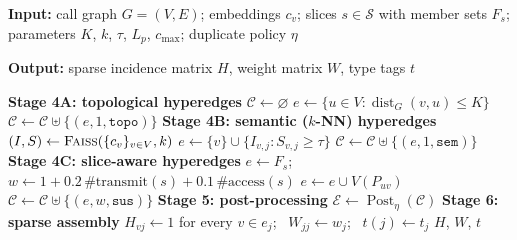 \begin{algorithm}[tbp]
  \caption[Construction and assembly of the \hgann{} hypergraph]{Construction and assembly of the
  \hgann{} hypergraph. Stages 4A to 4C restore the algorithm of the source publication
  \cite{norouzian2025hgannmal} with the conventions of Equations~\ref{eq:hgann:topo}
  to~\ref{eq:hgann:sus} written in; stages 5 and 6 add the post-processing and assembly that its
  prose describes.}
  \label{alg:hgann:construction}
  \small
  \textbf{Input:} call graph $G = (V, E)$; embeddings $c_v$; slices $s \in \mathcal{S}$ with
  member sets $F_s$; parameters $K$, $k$, $\tau$, $L_p$, $c_{\max}$; duplicate policy $\eta$\par
  \textbf{Output:} sparse incidence matrix $H$, weight matrix $W$, type tags $t$
  \begin{algorithmic}[1]
    \Statex \textbf{Stage 4A: topological hyperedges}
    \State $\mathcal{C} \gets \varnothing$ 
      \State $e \gets \{u \in V : \operatorname{dist}_G(v,u) \le K\}$
        \State $\mathcal{C} \gets \mathcal{C} \uplus \{(e, 1, \texttt{topo})\}$
      \EndIf
    \EndFor
    \Statex \textbf{Stage 4B: semantic ($k$-NN) hyperedges}
    \State $(I, S) \gets \textsc{Faiss}(\{c_v\}_{v \in V}, k)$
      \State $e \gets \{v\} \cup \{I_{v,j} : S_{v,j} \ge \tau\}$
        \State $\mathcal{C} \gets \mathcal{C} \uplus \{(e, 1, \texttt{sem})\}$
      \EndIf
    \EndFor
    \Statex \textbf{Stage 4C: slice-aware hyperedges}
      \State $e \gets F_s$; \ $w \gets 1 + 0.2\,\#\text{transmit}(s) + 0.1\,\#\text{access}(s)$
       
          \State $e \gets e \cup V(P_{uv})$
        \EndIf
      \EndFor
        \State $\mathcal{C} \gets \mathcal{C} \uplus \{(e, w, \texttt{sus})\}$
      \EndIf
    \EndFor
    \Statex \textbf{Stage 5: post-processing}
    \State $\mathcal{E} \gets \operatorname{Post}_{\eta}(\mathcal{C})$
    \Statex \textbf{Stage 6: sparse assembly}
      \State $H_{vj} \gets 1$ for every $v \in e_j$; \ $W_{jj} \gets w_j$; \ $t(j) \gets t_j$
    \EndFor
    \State \Return $H$, $W$, $t$
  \end{algorithmic}
\end{algorithm}

